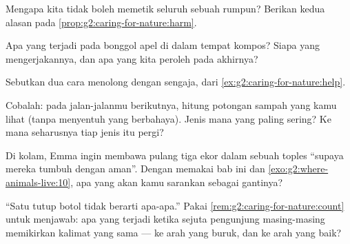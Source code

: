 \begin{exercise}[$\star$]\label{exo:g2:caring-for-nature:5}
Mengapa kita tidak boleh memetik seluruh  sebuah rumpun? Berikan
kedua alasan pada \cref{prop:g2:caring-for-nature:harm}.
\end{exercise}

\begin{exercise}[$\star$]\label{exo:g2:caring-for-nature:6}
Apa yang terjadi pada bonggol apel di dalam tempat kompos? Siapa yang
mengerjakannya, dan apa yang kita peroleh pada akhirnya?
\end{exercise}

\begin{exercise}[$\star$]\label{exo:g2:caring-for-nature:7}
Sebutkan dua cara menolong  dengan sengaja, dari
\cref{ex:g2:caring-for-nature:help}.
\end{exercise}

\begin{exercise}[$\star$]\label{exo:g2:caring-for-nature:8}
Cobalah: pada jalan-jalanmu berikutnya, hitung potongan sampah yang
kamu lihat (tanpa menyentuh yang berbahaya). Jenis mana yang paling
sering? Ke mana seharusnya tiap jenis itu pergi?
\end{exercise}

\begin{exercise}[$\star\star$]\label{exo:g2:caring-for-nature:9}
Di kolam, Emma ingin membawa pulang tiga ekor  dalam sebuah
toples ``supaya mereka tumbuh dengan aman''. Dengan memakai bab ini
dan \cref{exo:g2:where-animals-live:10}, apa yang akan kamu sarankan
sebagai gantinya?
\end{exercise}

\begin{exercise}[$\star\star$]\label{exo:g2:caring-for-nature:10}
``Satu tutup botol tidak berarti apa-apa.'' Pakai
\cref{rem:g2:caring-for-nature:count} untuk menjawab: apa yang terjadi
ketika sejuta pengunjung masing-masing memikirkan kalimat yang sama
--- ke arah yang buruk, dan ke arah yang baik?
\end{exercise}
